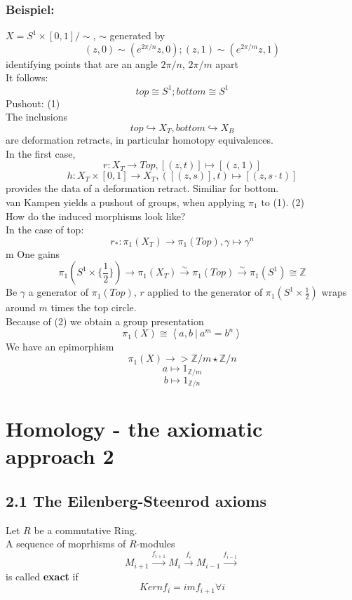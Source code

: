\documentclass{book}
\newcommand{\Bsp}[1]{\subsection{Beispiel: #1}}
\newcommand{\df}[1]{\textbf{#1}\index{#1}}
\newcommand{\Z}{\mathbb{Z}}
\begin{document}
\Bsp{}
$X = S^1\times [0,1]/\sim$, $\sim$ generated by
\[(z,0) \sim (e^{2\pi /n}z,0) ; (z,1) \sim (e^{2\pi /m}z,1) \]
identifying points that are  an angle $2\pi /n$, $2\pi/m$ apart\\
It follows:
\[top \cong S^1; bottom \cong S^1 \]
Pushout: (1)\\

The inclusions
\[top \hookrightarrow X_{T}, bottom \hookrightarrow X_B \]
are deformation retracts, in particular homotopy equivalences.\\

In the first case,
\[r: X_T \longrightarrow Top, [(z,t)] \longmapsto [(z,1)]\]
\[h: X_T\times [0,1]\longrightarrow X_T, ([(z,s)],t) \longmapsto [(z,s\cdot t)] \]
provides the data of a deformation retract. Similiar for bottom.\\

van Kampen yields a pushout of groups, when applying $\pi_1$ to (1).
(2)\\

How do the induced morphisms look like?\\
In the case of top:
\[r_* : \pi_1(X_T) \longrightarrow \pi_1(Top), \gamma \longmapsto \gamma^n \]m
One gains
\[\pi_1(S^1\times \{\frac{1}{2}\}) \longrightarrow \pi_1(X_T) \overset{\sim}{\longrightarrow} \pi_1(Top) \overset{\sim}{\longrightarrow} \pi_1(S^1) \cong \Z  \]
Be $\gamma$ a generator of $\pi_1(Top)$, $r$ applied to the generator of $\pi_1(S^1\times \frac{1}{2})$ wraps around $m$ times the top circle.\\

Because of (2) we obtain a group presentation
\[\pi_1(X) \cong \left\langle a,b~|~a^m = b^n \right\rangle \]
We have an epimorphism
\[\pi_1(X) \longrightarrow > \Z/m \star \Z /n \]
\[a \longmapsto 1_{\Z/m}\]
\[b \longmapsto 1_{\Z/n}\]

\newpage

\chapter{Homology - the axiomatic approach 2}

\section{2.1 The Eilenberg-Steenrod axioms}
Let $R$ be a commutative Ring.\\

A sequence of moprhisms of $R$-modules
\[M_{i+1} \overset{f_{i+1}}{\longrightarrow} M_i \overset{f_{i}}{\longrightarrow} M_{i-1} \overset{f_{i-1}}{\longrightarrow}\]
is called \df{exact} if
\[Kern f_i = im f_{i+1} \forall i\]
\end{document}
